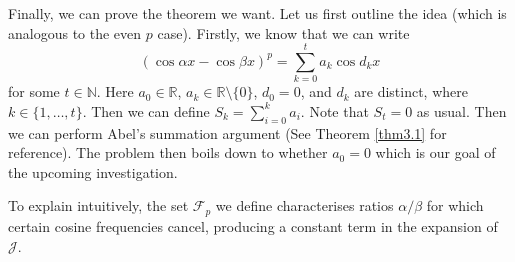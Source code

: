 \documentclass[12pt, reqno]{amsart}
\theoremstyle{plain}
\theoremstyle{definition}
\begin{document}




Finally, we can prove the theorem we want. Let us first outline the idea (which is analogous to the even $p$ case). Firstly, we know that we can write
\[(\cos \alpha x-\cos  \beta x)^p=\sum_{k=0}^ta_k\cos d_kx\]
for some $t\in\mathbb{N}$. Here $a_0\in\mathbb{R}$, $a_k\in\mathbb{R}\setminus\{0\}$, $d_0=0$, and $d_k$ are distinct, where $k\in\{1, \ldots, t\}$.
Then we can define $S_k=\sum_{i=0}^ka_i$. Note that $S_t=0$ as usual. Then we can perform Abel's summation argument (See Theorem \ref{thm3.1} for reference). The problem then boils down to whether $a_0=0$ which is our goal of the upcoming investigation.

To explain intuitively, the set $\mathcal{F}_p$ we define characterises ratios $\alpha/\beta$ for which certain cosine frequencies cancel, producing a constant term in the expansion of $\mathcal{J}$.
\end{document}
